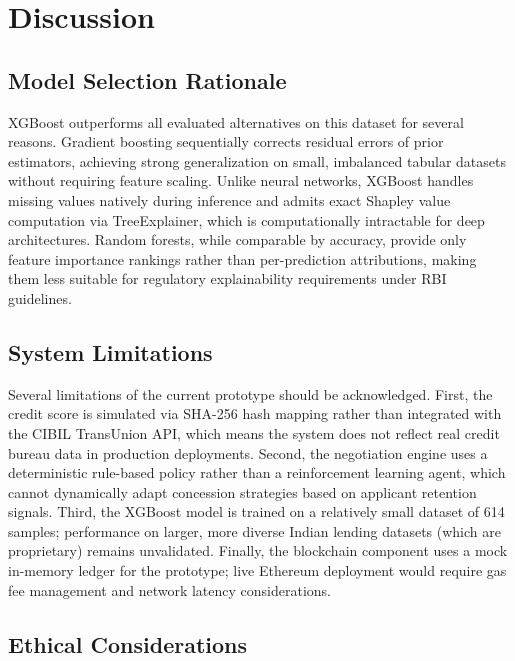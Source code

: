 \documentclass[conference]{IEEEtran}
\begin{document}
\section{Discussion}

\subsection{Model Selection Rationale}

XGBoost outperforms all evaluated alternatives on this
dataset for several reasons. Gradient boosting
sequentially corrects residual errors of prior
estimators, achieving strong generalization on small,
imbalanced tabular datasets without requiring feature
scaling. Unlike neural networks, XGBoost handles
missing values natively during inference and admits
exact Shapley value computation via TreeExplainer,
which is computationally intractable for deep
architectures. Random forests, while comparable by
accuracy, provide only feature importance rankings
rather than per-prediction attributions, making them
less suitable for regulatory explainability
requirements under RBI guidelines.

\subsection{System Limitations}

Several limitations of the current prototype should be
acknowledged. First, the credit score is simulated via
SHA-256 hash mapping rather than integrated with the
CIBIL TransUnion API, which means the system does not
reflect real credit bureau data in production deployments.
Second, the negotiation engine uses a deterministic
rule-based policy rather than a reinforcement learning
agent, which cannot dynamically adapt concession
strategies based on applicant retention signals.
Third, the XGBoost model is trained on a relatively
small dataset of 614 samples; performance on larger,
more diverse Indian lending datasets (which are
proprietary) remains unvalidated. Finally, the
blockchain component uses a mock in-memory ledger
for the prototype; live Ethereum deployment would
require gas fee management and network latency
considerations.

\subsection{Ethical Considerations}
\end{document}
